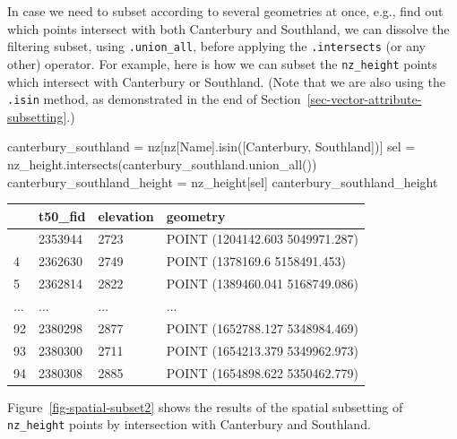 \documentclass[
  letterpaper,
]{krantz}
\newenvironment{Shaded}{\begin{snugshade}}{\end{snugshade}}
\newcommand{\NormalTok}[1]{\textcolor[rgb]{0.00,0.23,0.31}{#1}}
\newcommand{\OperatorTok}[1]{\textcolor[rgb]{0.37,0.37,0.37}{#1}}
\newcommand{\StringTok}[1]{\textcolor[rgb]{0.13,0.47,0.30}{#1}}
\begin{document}
In case we need to subset according to several geometries at once, e.g.,
find out which points intersect with both Canterbury and Southland, we
can dissolve the filtering subset, using \texttt{.union\_all}, before
applying the \texttt{.intersects} (or any other) operator. For example,
here is how we can subset the \texttt{nz\_height} points which intersect
with Canterbury or Southland. (Note that we are also using the
\texttt{.isin} method, as demonstrated in the end of
Section~\ref{sec-vector-attribute-subsetting}.)

\begin{Shaded}
\begin{Highlighting}[]
\NormalTok{canterbury\_southland }\OperatorTok{=}\NormalTok{ nz[nz[}\StringTok{\textquotesingle{}Name\textquotesingle{}}\NormalTok{].isin([}\StringTok{\textquotesingle{}Canterbury\textquotesingle{}}\NormalTok{, }\StringTok{\textquotesingle{}Southland\textquotesingle{}}\NormalTok{])]}
\NormalTok{sel }\OperatorTok{=}\NormalTok{ nz\_height.intersects(canterbury\_southland.union\_all())}
\NormalTok{canterbury\_southland\_height }\OperatorTok{=}\NormalTok{ nz\_height[sel]}
\NormalTok{canterbury\_southland\_height}
\end{Highlighting}
\end{Shaded}

\begin{longtable}[]{@{}llll@{}}
\toprule\noalign{}
& t50\_fid & elevation & geometry \\
\midrule\noalign{}
\endhead
\bottomrule\noalign{}
\endlastfoot
0 & 2353944 & 2723 & POINT (1204142.603 5049971.287) \\
4 & 2362630 & 2749 & POINT (1378169.6 5158491.453) \\
5 & 2362814 & 2822 & POINT (1389460.041 5168749.086) \\
... & ... & ... & ... \\
92 & 2380298 & 2877 & POINT (1652788.127 5348984.469) \\
93 & 2380300 & 2711 & POINT (1654213.379 5349962.973) \\
94 & 2380308 & 2885 & POINT (1654898.622 5350462.779) \\
\end{longtable}

Figure~\ref{fig-spatial-subset2} shows the results of the spatial
subsetting of \texttt{nz\_height} points by intersection with Canterbury
and Southland.
\end{document}
